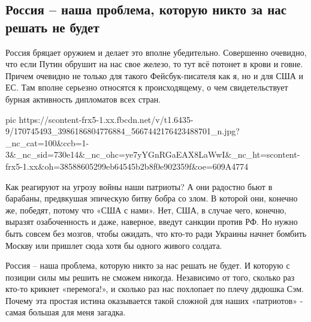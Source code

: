 
 
 
 
 

\subsection{Россия – наша проблема, которую никто за нас решать не будет}

Россия бряцает оружием и делает это вполне убедительно. Совершенно очевидно,
что если Путин обрушит на нас свое железо, то тут всё потонет в крови и говне.
Причем очевидно не только для такого Фейсбук-писателя как я, но и для США и ЕС.
Там вполне серьезно относятся к происходящему, о чем свидетельствует бурная
активность дипломатов всех стран. 


\ifcmt
  pic https://scontent-frx5-1.xx.fbcdn.net/v/t1.6435-9/170745493_3986186804776884_5667442176423488701_n.jpg?_nc_cat=100&ccb=1-3&_nc_sid=730e14&_nc_ohc=ye7yYGnRGaEAX8LaWwI&_nc_ht=scontent-frx5-1.xx&oh=38588605299eb64545b2b8f0e902359f&oe=609A4774
\fi


Как реагируют на угрозу войны наши патриоты? А они радостно бьют в барабаны,
предвкушая эпическую битву бобра со злом. В которой они, конечно же, победят,
потому что «США с нами». Нет, США, в случае чего, конечно, выразят
озабоченность и даже, наверное, введут санкции против РФ. Но нужно быть совсем
без мозгов, чтобы ожидать, что кто-то ради Украины начнет бомбить Москву или
пришлет сюда хотя бы одного живого солдата. 

Россия – наша проблема, которую никто за нас решать не будет. И которую с
позиции силы мы решить не сможем никогда. Независимо от того, сколько раз
кто-то крикнет «перемога!», и сколько раз нас похлопает по плечу дядюшка Сэм.
Почему эта простая истина оказывается такой сложной для наших «патриотов» -
самая большая для меня загадка.
